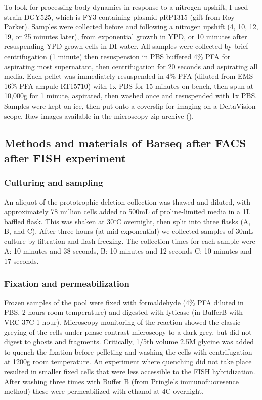 To look for processing-body dynamics in response to
a nitrogen upshift, I used strain DGY525, which is FY3
containing plasmid pRP1315 (gift from Roy Parker).
Samples were collected before and following a nitrogen upshift
(4, 10, 12, 19, or 25 minutes later),
from exponential growth in YPD, 
or 10 minutes after resuspending YPD-grown cells in DI water.
All samples were collected by brief centrifugation (1 minute)
then resuspension in PBS buffered 4\% PFA for 
aspirating most supernatant, then centrifugation for 20 seconds
and aspirating all media. Each pellet was 
immediately resuspended in 4\% PFA 
(diluted from EMS 16\% PFA ampule RT15710) 
with 1x PBS for 15 minutes on bench, 
then spun at 10,000g for 1 minute, aspirated, 
then washed once and resuspended with 1x PBS. 
Samples were kept on ice, then put onto a coverslip
for imaging on a DeltaVision scope. Raw images available in the
microscopy zip archive ().

\subsection{Methods and materials of Barseq after FACS after FISH experiment}

\subsubsection{Culturing and sampling}

An aliquot of the prototrophic deletion collection
\parencite{vandersluis2014broad} was thawed and diluted, with 
approximately 78 million cells added to 500mL of proline-limited media 
in a 1L baffled flask. This was shaken at 30$^{\circ}$C overnight, 
then split into three flasks (A, B, and C). 
After three hours (at mid-exponential)
we collected samples of 30mL culture by filtration and flash-freezing.
The collection times for each
sample were A: 10 minutes and 38 seconds, B: 10 minutes and 12 seconds
C: 10 minutes and 17 seconds.

\subsubsection{Fixation and permeabilization}

Frozen samples of the pool were fixed with formaldehyde
(4\% PFA diluted in PBS, 2 hours room-temperature) and digested
with lyticase (in BufferB with VRC 37C 1 hour).
Microscopy monitoring of the reaction showed the classic
greying of the cells under phase contrast microscopy to a dark grey, 
but did not digest to ghosts and fragments. 
Critically, 1/5th volume 2.5M glycine was added to quench the 
fixation before pelleting and washing the cells with centrifugation
at 1200g room temperature. An experiment where quenching did not
take place resulted in smaller fixed cells that were less accessible
to the FISH hybridization.
After washing three times with Buffer B (from Pringle's
immunofluoresence method) these were permeabilized with ethanol at
4C overnight.


